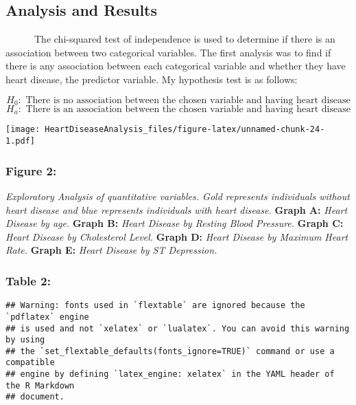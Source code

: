 \documentclass[
]{article}
\begin{document}
\hypertarget{analysis-and-results}{%
\subsection{Analysis and Results}\label{analysis-and-results}}

~~~~~~The chi-squared test of independence is used to determine if there
is an association between two categorical variables. The first analysis
was to find if there is any association between each categorical
variable and whether they have heart disease, the predictor variable. My
hypothesis test is as follows:

\[ H_0: \text{ There is no association between the chosen variable and having heart disease} \]
\[ H_a: \text{ There is an association between the chosen variable and having heart disease} \]

\newpage

\texttt{[image: HeartDiseaseAnalysis\_files/figure-latex/unnamed-chunk-24-1.pdf]}

\hypertarget{figure-2}{%
\subsubsection{Figure 2:}\label{figure-2}}

\emph{Exploratory Analysis of quantitative variables. Gold represents
individuals without heart disease and blue represents individuals with
heart disease.} \textbf{Graph A:} \emph{Heart Disease by age.}
\textbf{Graph B:} \emph{Heart Disease by Resting Blood Pressure.}
\textbf{Graph C:} \emph{Heart Disease by Cholesterol Level.}
\textbf{Graph D:} \emph{Heart Disease by Maximum Heart Rate.}
\textbf{Graph E:} \emph{Heart Disease by ST Depression.}

\newpage

\hypertarget{table-2}{%
\subsubsection{Table 2:}\label{table-2}}

\begin{verbatim}
## Warning: fonts used in `flextable` are ignored because the `pdflatex` engine
## is used and not `xelatex` or `lualatex`. You can avoid this warning by using
## the `set_flextable_defaults(fonts_ignore=TRUE)` command or use a compatible
## engine by defining `latex_engine: xelatex` in the YAML header of the R Markdown
## document.
\end{verbatim}
\end{document}
